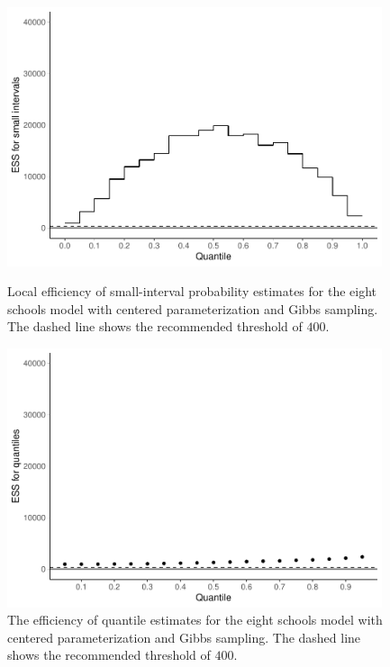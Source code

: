 \documentclass[american,]{article}
\theoremstyle{definition}
\begin{document}
\begin{figure}[tp]
  \centering
  \begin{minipage}{0.48\textwidth}
  \includegraphics[width=0.98\textwidth]{graphics/local-ess-jags-cp-tau-longer-1.pdf}
  \caption{Local efficiency of small-interval probability estimates for the 
  eight schools model with centered parameterization and Gibbs sampling. The dashed line shows the
    recommended threshold of $400$.}
  \label{fig:local-ess-jags-cp-tau-longer-1}
\end{minipage}
\hfill
  \begin{minipage}{0.48\textwidth}
  \includegraphics[width=0.98\textwidth]{graphics/quantile-ess-jags-cp-tau-longer-1.pdf}
  \caption{The efficiency of quantile estimates for the eight schools model with
  centered parameterization and Gibbs sampling. The dashed line shows the
    recommended threshold of $400$.}
  \label{fig:quantile-ess-jags-cp-tau-longer-1}
\end{minipage}
\end{figure}
\end{document}
